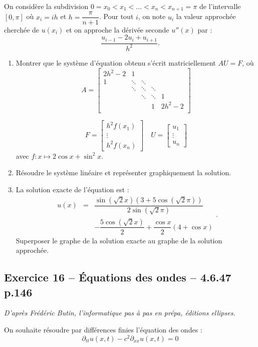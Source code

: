 \documentclass[10pt,fleqn]{article} %
\begin{document}
\begin{multicols}{2}
On considère la subdivision $0=x_0<x_1<...<x_n<x_{n+1} = \pi$ de l'intervalle $[0,\pi]$ où $x_i=ih$ et $h=\dfrac{\pi}{n+1}$. Pour tout $i$, on note $u_i$ la valeur approchée cherchée de $u(x_i)$ et on approche la dérivée seconde $u''(x)$ par :
$$
\dfrac{u_{i-1}-2u_i+u_{i+1}}{h^2}.
$$

\begin{enumerate}
\item Montrer que le système d'équation obtenu s'écrit matriciellement $AU=F$, où 
$$
A= 
\begin{bmatrix}
2h^2 - 2 & 1        & & & \\
1           & \ddots & \ddots & &  \\
& \ddots & \ddots &\ddots  & \\
& & \ddots & \ddots &1\\  
&& & 1 & 2h^2-2 \\
\end{bmatrix}
$$

$$
F=
\begin{bmatrix}
h^2 f(x_1) \\
\vdots \\
h^2 f(x_n)
\end{bmatrix}
\quad
U=
\begin{bmatrix}
u_1 \\
\vdots \\
u_n
\end{bmatrix}
$$
avec $f:x\mapsto 2 \cos x + \sin^2 x$.
\item Résoudre le système linéaire et représenter graphiquement la solution. 
\item La solution exacte de l'équation est :
$$
\begin{array}{lcl}
u(x)&=&\dfrac{\sin \left(\sqrt{2} x\right)  \left( 3+5 \cos \left(\sqrt 2 \pi \right)\right)}{2\sin \left(\sqrt{2} \pi\right)} \\
&&- \dfrac{5\cos \left(\sqrt{2} x\right)}{2}
+ \dfrac{\cos x}{2} \left( 4+\cos x\right)
\end{array}.
$$
Superposer le graphe de la solution exacte au graphe de la solution approchée.
\end{enumerate}


\subsection*{Exercice 16 -- Équations des ondes -- 4.6.47 p.146}
\begin{flushright}
\textit{D'après Frédéric Butin, l'informatique pas à pas en prépa, éditions ellipses.}
\end{flushright}
On souhaite résoudre par différences finies l'équation des ondes : 
$$
\partial_{tt} u(x,t) - c^2 \partial_{xx} u(x,t) = 0
$$


\end{multicols}
\end{document}
